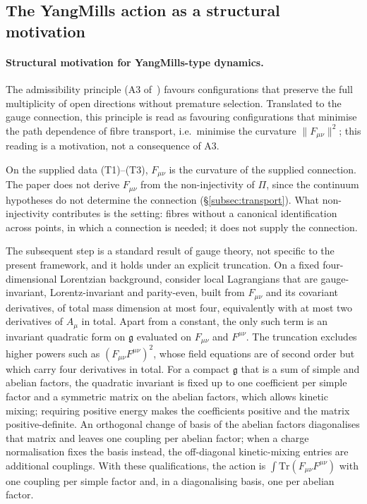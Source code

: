 \documentclass[11pt,a4paper]{article}
\begin{document}
  \subsection{The Yang\textendash Mills action as a structural motivation}

    \paragraph{Structural motivation for Yang\textendash Mills-type dynamics.}
      The admissibility principle (A3 of~\cite{Beau2026m}) favours configurations
      that preserve the full multiplicity of open directions without premature
      selection.
      Translated to the gauge connection, this principle is read as favouring configurations
      that minimise the path dependence of fibre transport, i.e.\ minimise the
      curvature $\|F_{\mu\nu}\|^2$; this reading is a motivation, not a consequence of A3.

      On the supplied data (T1)--(T3), $F_{\mu\nu}$ is the curvature of the supplied connection.
      The paper does not derive $F_{\mu\nu}$ from the non-injectivity of $\Pi$, since the continuum
      hypotheses do not determine the connection (§\ref{subsec:transport}).
      What non-injectivity contributes is the setting: fibres without a canonical identification
      across points, in which a connection is needed; it does not supply the connection.

      The subsequent step is a standard result of gauge theory, not specific to the present
      framework, and it holds under an explicit truncation.
      On a fixed four-dimensional Lorentzian background, consider local Lagrangians that are
      gauge-invariant, Lorentz-invariant and parity-even, built from $F_{\mu\nu}$ and its covariant
      derivatives, of total mass dimension at most four, equivalently with at most two derivatives of
      $A_\mu$ in total.
      Apart from a constant, the only such term is an invariant quadratic form on $\mathfrak{g}$
      evaluated on $F_{\mu\nu}$ and $F^{\mu\nu}$.
      The truncation excludes higher powers such as $(F_{\mu\nu}F^{\mu\nu})^2$, whose field equations are
      of second order but which carry four derivatives in total.
      For a compact $\mathfrak{g}$ that is a sum of simple and abelian factors, the quadratic invariant
      is fixed up to one coefficient per simple factor and a symmetric matrix on the abelian factors,
      which allows kinetic mixing; requiring positive energy makes the coefficients positive and the
      matrix positive-definite.
      An orthogonal change of basis of the abelian factors diagonalises that matrix and leaves one
      coupling per abelian factor; when a charge normalisation fixes the basis instead, the
      off-diagonal kinetic-mixing entries are additional couplings.
      With these qualifications, the action is $\int\mathrm{Tr}(F_{\mu\nu}F^{\mu\nu})$ with one coupling
      per simple factor and, in a diagonalising basis, one per abelian factor.
\end{document}
